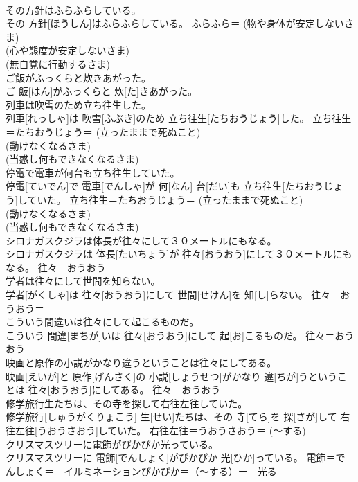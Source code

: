 \documentclass[8pt]{extreport}
\begin{document}
\begin{CJK}{UTF8}{min}
{\\	その方針はふらふらしている。	
\\	その 方針[ほうしん]はふらふらしている。	ふらふら＝ (物や身体が安定しないさま) 
\\	(心や態度が安定しないさま) 
\\	(無自覚に行動するさま) 
\\	ご飯がふっくらと炊きあがった。	
\\	ご 飯[はん]がふっくらと 炊[た]きあがった。	
\\	列車は吹雪のため立ち往生した。	
\\	列車[れっしゃ]は 吹雪[ふぶき]のため 立ち往生[たちおうじょう]した。	立ち往生＝たちおうじょう＝ (立ったままで死ぬこと) 
\\	(動けなくなるさま) 
\\	(当惑し何もできなくなるさま) 
\\	停電で電車が何台も立ち往生していた。	
\\	停電[ていでん]で 電車[でんしゃ]が 何[なん] 台[だい]も 立ち往生[たちおうじょう]していた。	立ち往生＝たちおうじょう＝ (立ったままで死ぬこと) 
\\	(動けなくなるさま) 
\\	(当惑し何もできなくなるさま) 
\\	シロナガスクジラは体長が往々にして３０メートルにもなる。	
\\	シロナガスクジラは 体長[たいちょう]が 往々[おうおう]にして３０メートルにもなる。	往々＝おうおう＝ 
\\	学者は往々にして世間を知らない。	
\\	学者[がくしゃ]は 往々[おうおう]にして 世間[せけん]を 知[し]らない。	往々＝おうおう＝ 
\\	こういう間違いは往々にして起こるものだ。	
\\	こういう 間違[まちが]いは 往々[おうおう]にして 起[お]こるものだ。	往々＝おうおう＝ 
\\	映画と原作の小説がかなり違うということは往々にしてある。	
\\	映画[えいが]と 原作[げんさく]の 小説[しょうせつ]がかなり 違[ちが]うということは 往々[おうおう]にしてある。	往々＝おうおう＝ 
\\	修学旅行生たちは、その寺を探して右往左往していた。	
\\	修学旅行[しゅうがくりょこう] 生[せい]たちは、その 寺[てら]を 探[さが]して 右往左往[うおうさおう]していた。	右往左往＝うおうさおう＝ (〜する) 
\\	クリスマスツリーに電飾がぴかぴか光っている。	
\\	クリスマスツリーに 電飾[でんしょく]がぴかぴか 光[ひか]っている。	電飾＝でんしょく＝　イルミネーションぴかぴか＝（〜する）ー　光る
}
\end{CJK}
\end{document}
